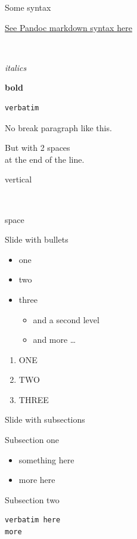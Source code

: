 \begin{frame}[fragile]{Some syntax}

\href{http://johnmacfarlane.net/pandoc/demo/example9/pandocs-markdown.html}{See
Pandoc markdown syntax here}

~

\emph{italics}

\textbf{bold}

\begin{verbatim}
verbatim
\end{verbatim}

No break paragraph like this.

But with 2 spaces\\at the end of the line.

vertical

~

space

\end{frame}

\begin{frame}{Slide with bullets}

\begin{itemize}
\itemsep1pt\parskip0pt
\item
  one
\item
  two
\item
  three

  \begin{itemize}
  \itemsep1pt\parskip0pt
  \item
    and a second level
  \item
    and more \ldots{}
  \end{itemize}
\end{itemize}

\begin{enumerate}
\def\labelenumi{\arabic{enumi}.}
\itemsep1pt\parskip0pt
\item
  ONE
\item
  TWO
\item
  THREE
\end{enumerate}

\end{frame}

\begin{frame}[fragile]{Slide with subsections}

\begin{block}{Subsection one}

\begin{itemize}
\itemsep1pt\parskip0pt
\item
  something here
\item
  more here
\end{itemize}

\end{block}

\begin{block}{Subsection two}

\begin{verbatim}
verbatim here
more
\end{verbatim}

\end{block}

\end{frame}

